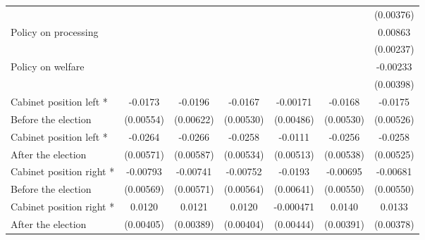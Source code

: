 \begin{table}[!ht]
\begin{tabular}{l*{6}{c}}
                    &                     &                     &                     &                     &                     &   (0.00376)         \\
[0.5em]
Policy on processing&                     &                     &                     &                     &                     &     0.00863\sym{***}\\
                    &                     &                     &                     &                     &                     &   (0.00237)         \\
[0.5em]
Policy on welfare   &                     &                     &                     &                     &                     &    -0.00233         \\
                    &                     &                     &                     &                     &                     &   (0.00398)         \\
[0.5em]
Cabinet position left * &     -0.0173\sym{**} &     -0.0196\sym{**} &     -0.0167\sym{**} &    -0.00171         &     -0.0168\sym{**} &     -0.0175\sym{**} \\
Before the election                    &   (0.00554)         &   (0.00622)         &   (0.00530)         &   (0.00486)         &   (0.00530)         &   (0.00526)         \\
[0.5em]
Cabinet position left * &     -0.0264\sym{***}&     -0.0266\sym{***}&     -0.0258\sym{***}&     -0.0111\sym{*}  &     -0.0256\sym{***}&     -0.0258\sym{***}\\
After the election                    &   (0.00571)         &   (0.00587)         &   (0.00534)         &   (0.00513)         &   (0.00538)         &   (0.00525)         \\
[0.5em]
Cabinet position right *&    -0.00793         &    -0.00741         &    -0.00752         &     -0.0193\sym{**} &    -0.00695         &    -0.00681         \\
 Before the election                    &   (0.00569)         &   (0.00571)         &   (0.00564)         &   (0.00641)         &   (0.00550)         &   (0.00550)         \\
[0.5em]
Cabinet position right * &      0.0120\sym{**} &      0.0121\sym{**} &      0.0120\sym{**} &   -0.000471         &      0.0140\sym{***}&      0.0133\sym{***}\\
 After the election                   &   (0.00405)         &   (0.00389)         &   (0.00404)         &   (0.00444)         &   (0.00391)         &   (0.00378)         \\

\end{tabular}
\end{table}

